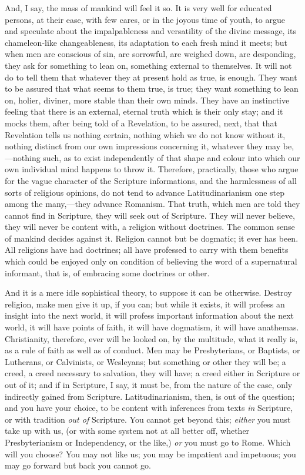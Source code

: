 And, I say, the mass of mankind will feel it so. It is very well
for educated persons, at their ease, with few cares, or in the joyous
time of youth, to argue and speculate about the impalpableness and
versatility of the divine message, its chameleon-like changeableness,
its adaptation to each fresh mind it meets; but when men are conscious
of sin, are sorrowful, are weighed down, are desponding, they ask for
something to lean on, something external to themselves. It will not do
to tell them that whatever they at present hold as true, is enough.
They want to be assured that what seems to them true, is true; they
want something to lean on, holier, diviner, more stable than their own
minds. They have an instinctive feeling that there is an external,
eternal truth which is their only stay; and it mocks them, after being
told of a Revelation, to be assured, next, that that Revelation tells
us nothing certain, nothing which we do not know without it, nothing
distinct from our own impressions concerning it, whatever they may be,—nothing
such, as to exist independently of that shape and colour into which
our own individual mind happens to throw it. Therefore, practically,
those who argue for the vague character of the Scripture
informations, and the harmlessness of all sorts of religious opinions,
do not tend to advance Latitudinarianism one step among the many,—they
advance Romanism. That truth, which men are told they cannot find in
Scripture, they will seek out of Scripture. They will never believe,
they will never be content with, a religion without doctrines. The
common sense of mankind decides against it. Religion cannot but be
dogmatic; it ever has been. All religions have had doctrines; all have
professed to carry with them benefits which could be enjoyed only on
condition of believing the word of a supernatural informant, that is,
of embracing some doctrines or other.

And it is a mere idle sophistical theory, to suppose it can be
otherwise. Destroy religion, make men give it up, if you can; but
while it exists, it will profess an insight into the next world, it
will profess important information about the next world, it will have
points of faith, it will have dogmatism, it will have anathemas.
Christianity, therefore, ever will be looked on, by the multitude,
what it really is, as a rule of faith as well as of conduct. Men may
be Presbyterians, or Baptists, or Lutherans, or Calvinists, or
Wesleyans; but something or other they will be; a creed, a creed
necessary to salvation, they will have; a creed either in Scripture or
out of it; and if in Scripture, I say, it must be, from the nature of
the case, only indirectly gained from Scripture. Latitudinarianism,
then, is out of the question; and you have your choice, to be content
with inferences from texts \emph{in} Scripture, or with tradition \emph{out
of} Scripture. You cannot get beyond this; \emph{either} you must
take up with us, (or with some system not at all better off, whether
Presbyterianism or Independency, or the like,) \emph{or} you must go to Rome.
Which will you choose? You may not like us; you may be impatient
and impetuous; you may go forward but back you cannot go.

